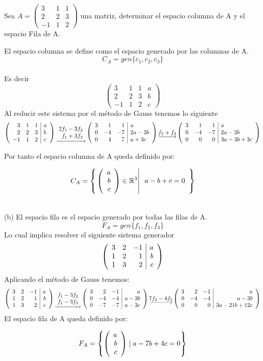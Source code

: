 \begin{ejercicio}
Sea $A=
\left(
\begin{array}{rrr}
3&1&1\\
2&2&3\\
-1&1&2
\end{array}
\right)$ una matriz, determinar el espacio columna de A y el espacio Fila de A.


\sol
El espacio columna se define como el espacio generado por las columnas de A.
\[C_A=gen\{c_1, c_2, c_3\}\]
~\\
Es decir
$$\left(
\begin{array}{rrr|r}
3&1&1&a\\
2&2&3&b\\
-1&1&2&c
\end{array}
\right)$$
Al reducir este sistema por el método de Gauss tenemos lo siguiente
$$\reducir{{rrr|l}}{3&1&1&a\\2&2&3&b\\-1&1&2&c}
\underrightarrow{\begin{array}{r}
    2f_1 - 3f_2 \\
    f_1 + 3f_3
\end{array}}
\reducir{rrr|l}{3&1&1&a\\0&-4&-7&2a-3b\\0&4&7&a+3c}
\underrightarrow{f_2 + f_3}
\reducir{rrr|l}{3&1&1&a\\0&-4&-7&2a-3b\\0&0&0&3a-3b+3c}$$

 Por tanto el espacio columna de A queda definido por:
 
\[C_A=\llaves{\vectrtres{a}{b}{c} \in \rtres}
{\begin{array}{r}
a-b+c=0\\
\end{array}}
\]

~\\
(b) El espacio fila es el espacio generado por todas las filas de A. 
\[F_A=gen\{f_1, f_2, f_3\}\]
Lo cual implica resolver el siguiente sistema generador
$$\reducir{rrr|r}{
3&2&-1&a\\
1&2&1&b\\
1&3&2&c}$$
Aplicando el método de Gauss tenemos:~
$$\reducir{rrr|r}{
3&2&-1&a\\
1&2&1&b\\
1&3&2&c}
\underrightarrow{\begin{array}{c}
    f_1 - 3f_2\\
    f_1 - 3f_3
\end{array}}
\reducir{rrr|r}{
3&2&-1&a\\
0&-4&-4&a-3b\\
0&-7&-7&a-3c
}
\underrightarrow{7f_2 - 4f_3}
\reducir{rrr|r}{
3&2&-1&a\\
0&-4&-4&a-3b\\
0&0&0&3a-21b+12c}
$$
El espacio fila de A queda definido por:
 
 \[F_A=\left\lbrace  \vectrtres{a}{b}{c} \mid a-7b+4c=0 \right\rbrace  \]



\end{ejercicio}

